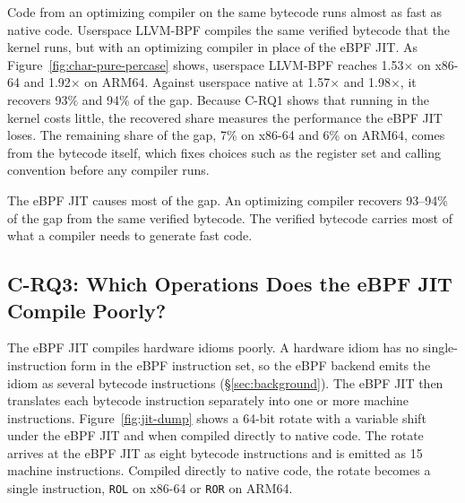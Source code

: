 Code from an optimizing compiler on the same bytecode runs almost as fast as native code.
Userspace LLVM-BPF compiles the same verified bytecode that the kernel runs, but with an optimizing compiler in place of the eBPF JIT.
As Figure~\ref{fig:char-pure-percase} shows, userspace LLVM-BPF reaches 1.53$\times$ on x86-64 and 1.92$\times$ on ARM64.
Against userspace native at 1.57$\times$ and 1.98$\times$, it recovers 93\% and 94\% of the gap.
Because C-RQ1 shows that running in the kernel costs little, the recovered share measures the performance the eBPF JIT loses.
The remaining share of the gap, 7\% on x86-64 and 6\% on ARM64, comes from the bytecode itself, which fixes choices such as the register set and calling convention before any compiler runs.

\begin{finding}
\finlabel The eBPF JIT causes most of the gap. An optimizing compiler recovers 93--94\% of the gap from the same verified bytecode. The verified bytecode carries most of what a compiler needs to generate fast code.
\end{finding}

\subsection{C-RQ3: Which Operations Does the eBPF JIT Compile Poorly?}
\label{subsec:char-idiom}

The eBPF JIT compiles hardware idioms poorly.
A hardware idiom has no single-instruction form in the eBPF instruction set, so the eBPF backend emits the idiom as several bytecode instructions (\S\ref{sec:background}).
The eBPF JIT then translates each bytecode instruction separately into one or more machine instructions.
Figure~\ref{fig:jit-dump} shows a 64-bit rotate with a variable shift under the eBPF JIT and when compiled directly to native code.
The rotate arrives at the eBPF JIT as eight bytecode instructions and is emitted as 15 machine instructions.
Compiled directly to native code, the rotate becomes a single instruction, \texttt{ROL} on x86-64 or \texttt{ROR} on ARM64.

